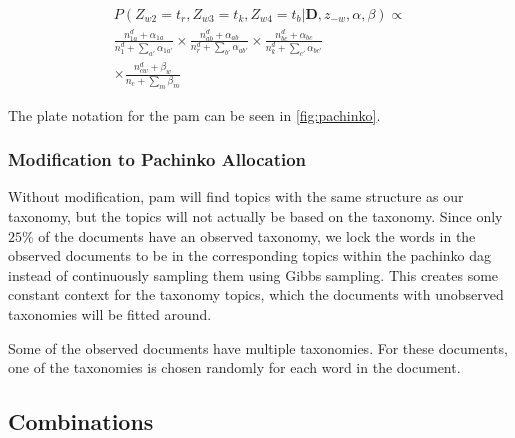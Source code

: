 \begin{align*}
	P(Z_{w2} = t_r, Z_{w3} = t_k, Z_{w4} = t_b | \textbf{D}, z_{-w}, \alpha, \beta) \propto \\
	\frac{n_{1a}^d + \alpha_{1a}}{n_1^d + \sum_{a'} \alpha_{1a'}} \times
	\frac{n_{ab}^d + \alpha_{ab}}{n_r^d + \sum_{b'} \alpha_{ab'}}  \times 
	\frac{n_{bc}^d + \alpha_{bc}}{n_{k}^d + \sum_{c'} \alpha_{bc'}} \\ \times 
	\frac{n_{cw}^d + \beta_{w}}{n_{c} + \sum_{m} \beta_{m}} 
\end{align*}

The plate notation for the \gls{pam} can be seen in \autoref{fig:pachinko}.





\subsubsection{Modification to Pachinko Allocation}
Without modification, \gls{pam} will find topics with the same structure as our taxonomy, but the topics will not actually be based on the taxonomy.
Since only $25\%$ of the documents have an observed taxonomy, we lock the words in the observed documents to be in the corresponding topics within the pachinko \gls{dag} instead of continuously sampling them using Gibbs sampling.
This creates some constant context for the taxonomy topics, which the documents with unobserved taxonomies will be fitted around.

Some of the observed documents have multiple taxonomies.
For these documents, one of the taxonomies is chosen randomly for each word in the document.

\subsection{Combinations}
